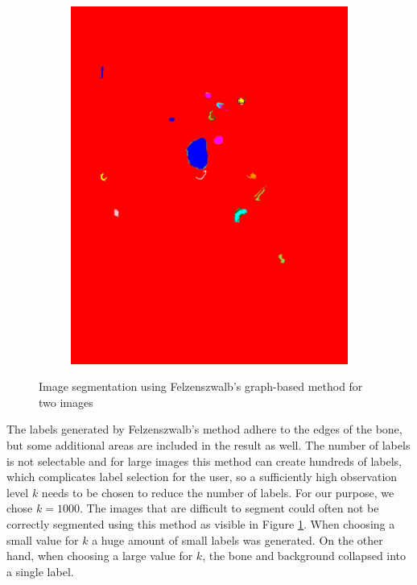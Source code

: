 \documentclass[pdftex,12pt,a4paper]{report}
\begin{document}
\begin{figure}[h]
\begin{subfigure}[b]{0.24\textwidth}
		\subcaption{}
		\label{fig:felzenszwalb:bad}
	\end{subfigure}
	\begin{subfigure}[b]{0.24\textwidth}
		\centering
		\includegraphics[width=.9\linewidth]{img/segmentation/bad/felzenszwalb/segmented.jpg}
		\subcaption*{}
		\label{}
	\end{subfigure}
	\caption{Image segmentation using Felzenszwalb's graph-based method for two images}
	\label{fig:felzenszwalb}
\end{figure}

The labels generated by Felzenszwalb's method adhere to the edges of the bone, but some additional areas are included in the result as well. The number of labels is not selectable and for large images this method can create hundreds of labels, which complicates label selection for the user, so a sufficiently high observation level $k$ needs to be chosen to reduce the number of labels. For our purpose, we chose $k=1000$. The images that are difficult to segment could often not be correctly segmented using this method as visible in Figure \ref{fig:felzenszwalb:bad}. When choosing a small value for $k$ a huge amount of small labels was generated. On the other hand, when choosing a large value for $k$, the bone and background collapsed into a single label.
\end{document}
